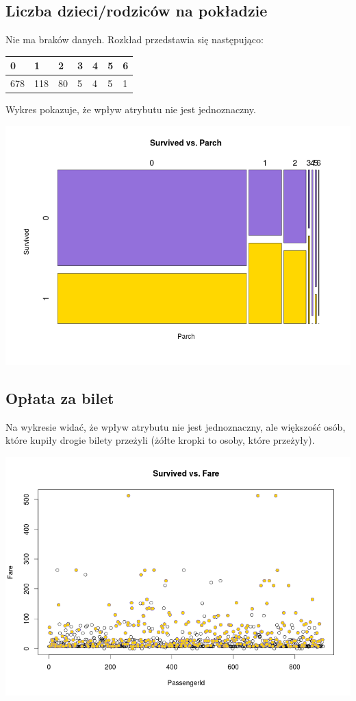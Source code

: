 \documentclass{article}
\begin{document}
\subsection{Liczba dzieci/rodziców na pokładzie}

Nie ma braków danych. Rozkład przedstawia się następująco:
\begin{center}
    \begin{tabular}{| l | l | l | l | l | l | l |}
    \hline
 0  & 1  & 2 &  3  & 4 &  5  & 6 \\ \hline
 678 & 118 & 80 &  5  & 4  & 5 &  1 \\
    \hline
    \end{tabular}
\end{center}

Wykres pokazuje, że wpływ atrybutu nie jest jednoznaczny.
\begin{center}
\includegraphics[scale=0.40]{images/survived-vs-parch.png}
\end{center}

\subsection{Opłata za bilet}

Na wykresie widać, że wpływ atrybutu nie jest jednoznaczny, ale większość osób, które kupiły drogie bilety przeżyli (żółte kropki to osoby, które przeżyły).
\begin{center}
\includegraphics[scale=0.40]{images/survived-vs-fare.png}
\end{center}
\end{document}
